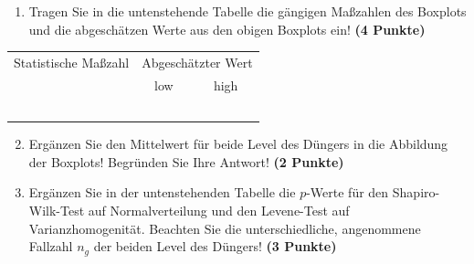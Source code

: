 \documentclass[a4paper, 10pt]{scrartcl}\usepackage[]{graphicx}\usepackage[]{xcolor}
\begin{document}
\begin{enumerate}
\item Tragen Sie in die untenstehende Tabelle die g{\"a}ngigen Ma{\ss}zahlen des
  Boxplots und die abgesch{\"a}tzen Werte aus den obigen Boxplots ein! \textbf{(4 Punkte)}
\end{enumerate}

\begin{center}
  \large
  \begin{tabular}[c]{c|c|c}
    Statistische Ma{\ss}zahl  & \multicolumn{2}{c}{Abgesch{\"a}tzter Wert}  \strut\\
    & low & high \\
    \hline
    \hspace{2cm} & \hspace{2cm} & \hspace{2cm} \strut\\
    \hline
    \hspace{2cm} & \hspace{2cm} & \hspace{2cm} \strut\\
    \hline
    \hspace{2cm} & \hspace{2cm} & \hspace{2cm} \strut\\
    \hline
    \hspace{2cm} & \hspace{2cm} & \hspace{2cm} \strut\\
    \hline
    \hspace{2cm} & \hspace{2cm} & \hspace{2cm} \strut\\
    \hline
  \end{tabular}
\end{center}


\begin{enumerate}
  \setcounter{enumi}{1}
\item Erg{\"a}nzen Sie den Mittelwert f{\"u}r beide Level des D{\"u}ngers in die
  Abbildung der Boxplots! Begr{\"u}nden Sie Ihre Antwort! \textbf{(2 Punkte)}
\item Erg{\"a}nzen Sie in der untenstehenden Tabelle die $p$-Werte f{\"u}r den
  Shapiro-Wilk-Test auf Normalverteilung und den Levene-Test auf
  Varianzhomogenit{\"a}t. Beachten Sie die unterschiedliche, angenommene
  Fallzahl $n_g$ der beiden Level des D{\"u}ngers! \textbf{(3 Punkte)}
\end{enumerate}
\end{document}
